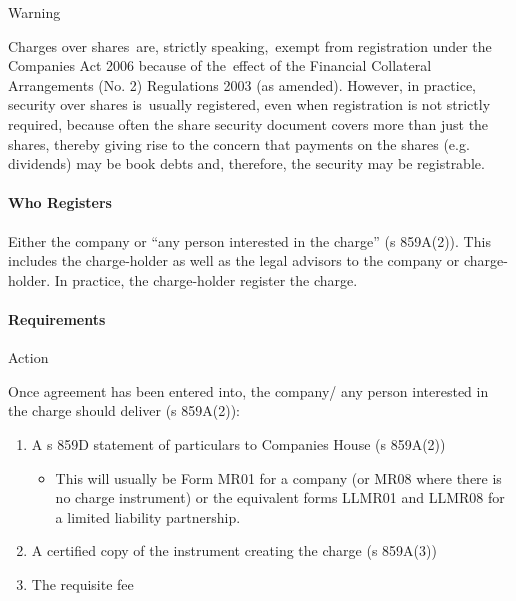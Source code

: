 \documentclass[
]{article}
\providecommand{\tightlist}{%
  \setlength{\itemsep}{0pt}\setlength{\parskip}{0pt}}
\newenvironment{env-0174d31b-3f44-410b-9ae6-7a7b66b1e278}
{
    \savenotes\tcolorbox[blanker,breakable,left=5pt,borderline west={2pt}{-4pt}{aquamarine}]
}
{
    \endtcolorbox\spewnotes
}
\newenvironment{env-31409176-8a91-46bb-85fd-48f2d6a04234}
{
    \savenotes\tcolorbox[blanker,breakable,left=5pt,borderline west={2pt}{-4pt}{orange}]
}
{
    \endtcolorbox\spewnotes
}
\begin{document}
\begin{env-31409176-8a91-46bb-85fd-48f2d6a04234}

Warning

Charges over shares~are, strictly speaking,~exempt from registration
under the Companies Act 2006 because of the~effect of the Financial
Collateral Arrangements (No. 2) Regulations 2003 (as amended). However,
in practice, security over shares is~usually registered, even when
registration is not strictly required, because often the share security
document covers more than just the shares, thereby giving rise to the
concern that payments on the shares (e.g. dividends) may be book debts
and, therefore, the security may be registrable.

\end{env-31409176-8a91-46bb-85fd-48f2d6a04234}

\hypertarget{who-registers}{%
\paragraph{Who Registers}\label{who-registers}}

Either the company or ``any person interested in the charge'' (s
859A(2)). This includes the charge-holder as well as the legal advisors
to the company or charge-holder. In practice, the charge-holder register
the charge.

\hypertarget{requirements}{%
\paragraph{Requirements}\label{requirements}}

\begin{env-0174d31b-3f44-410b-9ae6-7a7b66b1e278}

Action

Once agreement has been entered into, the company/ any person interested
in the charge should deliver (s 859A(2)):

\begin{enumerate}
\tightlist
\item
  A s 859D statement of particulars to Companies House (s 859A(2))

  \begin{itemize}
  \tightlist
  \item
    This will usually be Form MR01 for a company (or MR08 where there is
    no charge instrument) or the equivalent forms LLMR01 and LLMR08 for
    a limited liability partnership.
  \end{itemize}
\item
  A certified copy of the instrument creating the charge (s 859A(3))
\item
  The requisite fee
\end{enumerate}

\end{env-0174d31b-3f44-410b-9ae6-7a7b66b1e278}
\end{document}
